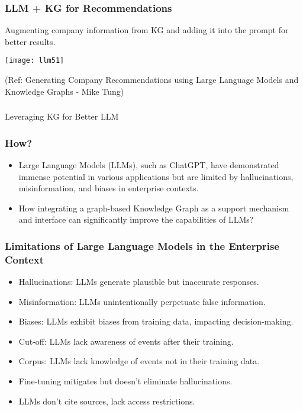 \begin{frame}[fragile]\frametitle{LLM + KG for Recommendations}

Augmenting company information from KG and adding it into the prompt for better results.

\begin{center}
\texttt{[image: llm51]}
\end{center}	

{\tiny (Ref: Generating Company Recommendations using Large Language Models and Knowledge Graphs - Mike Tung)}

\end{frame}

\begin{frame}[fragile]\frametitle{}
\begin{center}
{\Large Leveraging KG for Better LLM}
\end{center}
\end{frame}

\begin{frame}[fragile]\frametitle{How?}

\begin{itemize}
\item Large Language Models (LLMs), such as ChatGPT, have demonstrated immense potential in various applications but are limited by hallucinations, misinformation, and biases in enterprise contexts.
\item How integrating a graph-based Knowledge Graph as a support mechanism and interface can significantly improve the capabilities of LLMs?
\end{itemize}	

\end{frame}

\begin{frame}[fragile]\frametitle{Limitations of Large Language Models in the Enterprise Context}

\begin{itemize}
\item Hallucinations: LLMs generate plausible but inaccurate responses.
\item Misinformation: LLMs unintentionally perpetuate false information.
\item Biases: LLMs exhibit biases from training data, impacting decision-making.
\item Cut-off: LLMs lack awareness of events after their training.
\item Corpus: LLMs lack knowledge of events not in their training data.
\item Fine-tuning mitigates but doesn't eliminate hallucinations.
\item LLMs don't cite sources, lack access restrictions.
\end{itemize}	

\end{frame}


